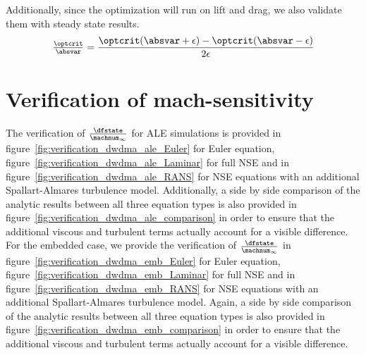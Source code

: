 \documentclass[../main.tex]{subfiles}
\begin{document}
Additionally, since the optimization will run on lift and drag, we also validate them with steady state results.
\begin{align}
\tfrac{\optcrit}{\absvar}=\frac{\optcrit(\absvar+\epsilon)-\optcrit(\absvar-\epsilon)}{2 \epsilon}
\end{align}



\section{Verification of mach-sensitivity}
The verification of $\tfrac{\dfstate}{\machnum_{\infty}}$ for ALE simulations is provided in figure~\ref{fig:verification_dwdma_ale_Euler} for Euler equation, figure~\ref{fig:verification_dwdma_ale_Laminar} for full \ac{NSE} and in figure~\ref{fig:verification_dwdma_ale_RANS} for \ac{NSE} equations with an additional Spallart-Almares turbulence model.
Additionally, a side by side comparison of the analytic results between all three equation types is also provided in figure~\ref{fig:verification_dwdma_ale_comparison} in order to ensure that the additional viscous and turbulent terms actually account for a visible difference.\\
For the embedded case, we provide the verification of $\tfrac{\dfstate}{\machnum_{\infty}}$  in figure~\ref{fig:verification_dwdma_emb_Euler} for Euler equation, figure~\ref{fig:verification_dwdma_emb_Laminar} for full \ac{NSE} and in figure~\ref{fig:verification_dwdma_emb_RANS} for \ac{NSE} equations with an additional Spallart-Almares turbulence model.
Again, a side by side comparison of the analytic results between all three equation types is also provided in figure~\ref{fig:verification_dwdma_emb_comparison} in order to ensure that the additional viscous and turbulent terms actually account for a visible difference.
\end{document}
